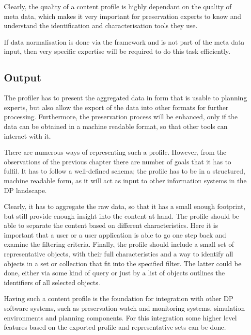 Clearly, the quality of a content profile is highly dependant on the quality of meta data, which makes it very important for preservation experts to know and understand the identification and characterisation tools they use.

If data normalisation is done via the framework and is not part of the meta data input, then very specific expertise will be required to do this task efficiently.

\subsection{Output}
The profiler has to present the aggregated data in form that is usable to planning experts, but also allow the export of the data into other formats for further processing. Furthermore, the preservation process will be enhanced, only if the data
can be obtained in a machine readable format, so that other tools can interact with it.

There are numerous ways of representing such a profile. However, from the observations of the previous chapter there are number of goals that it has to fulfil. It has to follow a well-defined schema; the profile has to be in a structured, machine readable form, as it will act as input to other information systems in the DP landscape.

Clearly, it has to aggregate the raw data, so that it has a small enough footprint, but still provide enough insight into the content at hand. The profile should be able to separate the content based on different characteristics. Here it is important that a user or a user application is able to go one step back and examine the filtering criteria. Finally, the profile should include a small set of representative objects, with their full characteristics and a way to identify all objects in a set or collection that fit into the specified filter. The latter could be done, either via some kind of query or just by a list of objects outlines the identifiers of all selected objects.

Having such a content profile is the foundation for integration with other DP software systems, such as preservation watch and monitoring systems, simulation environments and planning components. For this integration some higher level features based on the exported profile and representative sets can be done.


